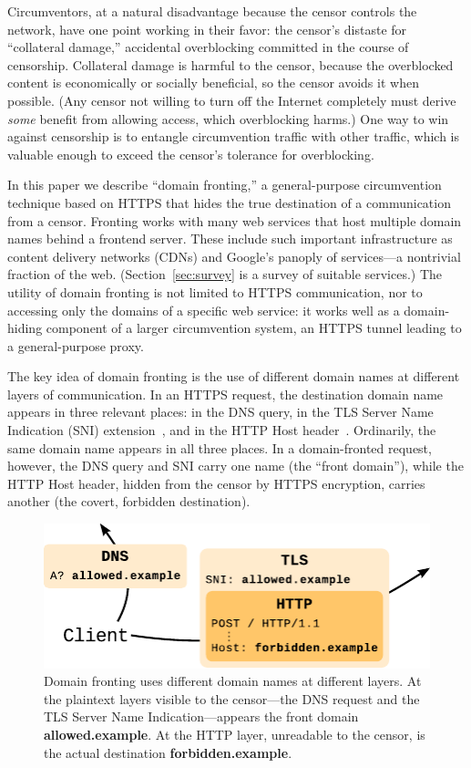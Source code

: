 \documentclass{sig-alternate}
\begin{document}
Circumventors,
at a natural disadvantage because the censor controls the network,
have one point working in their favor:
the censor's distaste for ``collateral damage,''
accidental overblocking committed in the course of censorship.
Collateral damage is harmful to the censor,
because the overblocked content is economically or socially beneficial,
so the censor avoids it when possible.
(Any censor not willing to turn off the Internet completely
must derive \emph{some} benefit from allowing access,
which overblocking harms.)
One way to win against censorship is to entangle circumvention traffic
with other traffic, which is valuable enough to
exceed the censor's tolerance for overblocking.

In this paper we describe ``domain fronting,'' a general-purpose circumvention technique
based on HTTPS that hides the true destination of a communication
from a censor.
Fronting works with many web services that host multiple domain names
behind a frontend server.
These include such important infrastructure as
content delivery networks (CDNs)
and Google's panoply of services---a nontrivial fraction of the web.
(Section~\ref{sec:survey} is a survey of suitable services.)
The utility of domain fronting is not limited to HTTPS communication,
nor to accessing only the domains of a specific web service:
it works well as a domain-hiding component of a larger circumvention system,
an HTTPS tunnel leading to a general-purpose proxy.

The key idea of domain fronting is the use of
different domain names at different layers of communication.
In an HTTPS request, the destination domain name appears
in three relevant places:
in the DNS query,
in the TLS Server Name Indication (SNI) extension~\cite[\S 3]{rfc6066},
and in the HTTP Host header~\cite[\S 14.23]{rfc2616}.
Ordinarily, the same domain name appears in all three places.
In a domain-fronted request, however,
the DNS query and SNI carry one name (the ``front domain''),
while the HTTP Host header,
hidden from the censor by HTTPS encryption,
carries another (the covert, forbidden destination).

\begin{figure}[ht]
\centering
\includegraphics[width=\linewidth]{fronting-diagram}
\caption{
Domain fronting uses different domain names at different layers.
At the plaintext layers visible to the censor---the DNS request and the
TLS Server Name Indication---appears
the front domain \mbox{\textbf{allowed.example}}.
At the HTTP layer, unreadable to the censor,
is the actual destination \mbox{\textbf{forbidden.example}}.
}
\label{fig:fronting}
\end{figure}
\end{document}
